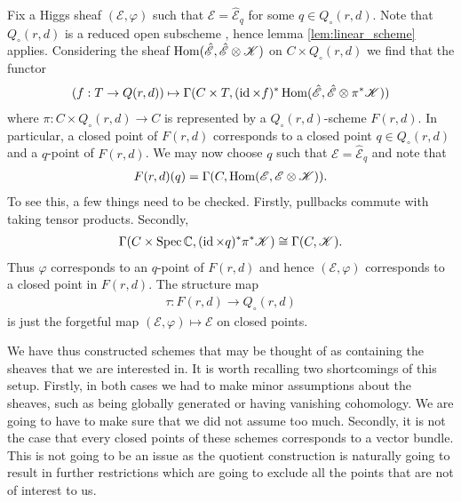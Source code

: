 \documentclass[12pt]{ociamthesis}  %
\begin{document}
\begin{example}\label{ex:quot_scheme_of_higgs}
  Fix a Higgs sheaf $(\mathscr E,\varphi)$ such that
  $\mathscr E = \hat{\mathscr E}_q$ for some $q\in Q_\circ(r,d)$.
  Note that $Q_\circ(r,d)$ is a reduced open subscheme
  \cite[281]{nitsure1991}, hence lemma
  \ref{lem:linear_scheme} applies.
  Considering the sheaf $\operatorname{Hom}(\hat{\mathscr E},\hat{\mathscr E}\otimes\mathscr K)$ on
  $C\times Q_\circ(r,d)$ we find that the functor
  \begin{align*}
    (f:T\to Q(r,d))
    \mapsto
    \Gamma(C\times T,(\operatorname{id}\times f)^*\operatorname{Hom}(\hat{\mathscr E},\hat{\mathscr E}\otimes\pi^*\mathscr K))
  \end{align*}
  where $\pi : C\times Q_\circ(r,d)\to C$ is represented by a
  $Q_\circ(r,d)$-scheme $F(r,d)$.
  In particular, a closed point of $F(r,d)$ corresponds to a
  closed point $q\in Q_\circ(r,d)$ and a $q$-point of $F(r,d)$.
  We may now choose $q$ such that $\mathscr E = \hat{\mathscr E}_q$ and note
  that
  \begin{align*}
    F(r,d)(q) = \Gamma(C,\operatorname{Hom}(\mathscr E,\mathscr E\otimes\mathscr K)).
  \end{align*}
  To see this, a few things need to be checked. Firstly, pullbacks
  commute with taking tensor products. Secondly,
  \begin{align*}
    \Gamma(C\times\operatorname{Spec}\mathbb C,(\operatorname{id}\times q)^*\pi^*\mathscr K)
    \cong \Gamma(C,\mathscr K).
  \end{align*}
  Thus $\varphi$ corresponds to an $q$-point of $F(r,d)$
  and hence $(\mathscr E,\varphi)$ corresponds to a closed point in
  $F(r,d)$. The structure map
  \begin{align*}
    \tau : F(r,d) \longrightarrow Q_\circ(r,d)
  \end{align*}
  is just the forgetful map $(\mathscr E,\varphi) \mapsto \mathscr E$
  on closed points.
\end{example}

We have thus constructed schemes that may be thought of as containing
the sheaves that we are interested in. It is worth recalling two
shortcomings of this setup. Firstly, in both cases we had to make
minor assumptions about the sheaves, such as being globally generated
or having vanishing cohomology. We are going to have to make sure that
we did not assume too much. Secondly, it is not the case that every
closed points of these schemes corresponds to a vector bundle. This is
not going to be an issue as the quotient construction is naturally
going to result in further restrictions which are going to exclude
all the points that are not of interest to us.
\end{document}
